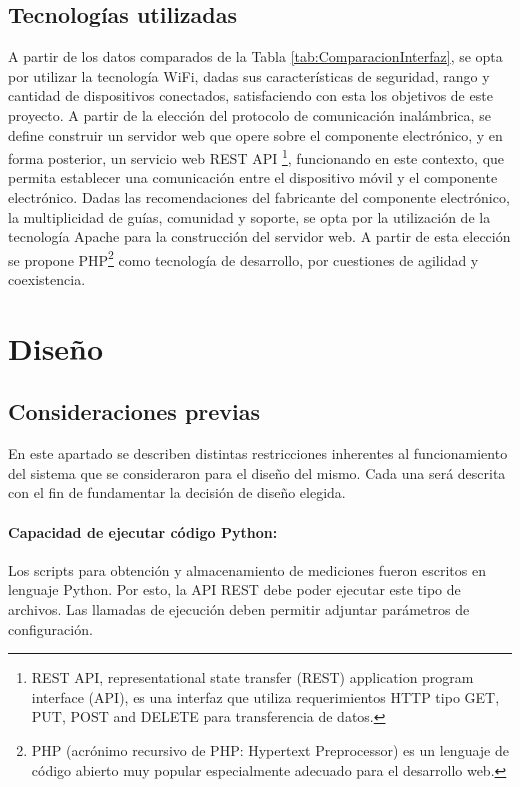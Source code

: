         \subsection{Tecnologías utilizadas}
            A partir de los datos comparados de la Tabla \ref{tab:ComparacionInterfaz}, se opta por utilizar la tecnología WiFi, dadas sus características de seguridad, rango y cantidad de dispositivos conectados, satisfaciendo con esta los objetivos de este proyecto.
            A partir de la elección del protocolo de comunicación inalámbrica, se define construir un servidor web que opere sobre el componente electrónico, y en forma posterior, un servicio web REST API \footnote{REST API, representational state transfer (REST) application program interface (API), es una interfaz que utiliza requerimientos HTTP tipo GET, PUT, POST and DELETE para transferencia de datos.}, funcionando en este contexto, que permita establecer una comunicación entre el dispositivo móvil y el componente electrónico.
            Dadas las recomendaciones del fabricante del componente electrónico, la multiplicidad de guías, comunidad y soporte, se opta por la utilización de la tecnología Apache para la construcción del servidor web. A partir de esta elección se propone PHP\footnote{PHP (acrónimo recursivo de PHP: Hypertext Preprocessor) es un lenguaje de código abierto muy popular especialmente adecuado para el desarrollo web.} como tecnología de desarrollo, por cuestiones de agilidad y coexistencia.

    
    \section{Diseño}
        
        \subsection{Consideraciones previas}
            \par En este apartado se describen distintas restricciones inherentes al funcionamiento del sistema que se consideraron para el diseño del mismo. Cada una será descrita con el fin de fundamentar la decisión de diseño elegida.

            \paragraph{Capacidad de ejecutar código Python:}
                \par Los scripts para obtención y almacenamiento de mediciones fueron escritos en lenguaje Python. Por esto, la API REST debe poder ejecutar este tipo de archivos. Las llamadas de ejecución deben permitir adjuntar parámetros de configuración.
        
